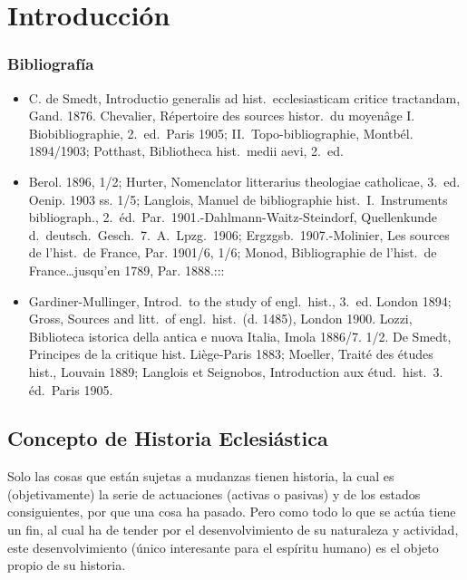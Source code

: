 \raggedbottom{} \documentclass[12pt, a4paper]{book}
\begin{document}
\chapter{Introducción}
\subsection{Bibliografía}
\begin{itemize}
  \item C. de Smedt, Introductio generalis ad hist.\ ecclesiasticam critice tractandam, Gand. 1876. Chevalier, Répertoire des sources histor.\ du moyenâge I. Biobibliographie, 2.\ ed.\ Paris 1905; II.\ Topo-bibliographie, Montbél. 1894/1903; Potthast, Bibliotheca hist.\ medii aevi, 2.\ ed.\
  \item Berol. 1896, 1/2; Hurter, Nomenclator litterarius theologiae catholicae, 3.\ ed. Oenip. 1903 ss. 1/5; Langlois, Manuel de bibliographie hist.\ I.\ Instruments bibliograph., 2.\ éd.\ Par.\ 1901.-Dahlmann-Waitz-Steindorf, Quellenkunde d.\ deutsch.\ Gesch.\ 7.\ A.\ Lpzg.\ 1906; Ergzgsb.\ 1907.-Molinier, Les sources de l'hist.\ de France, Par. 1901/6, 1/6; Monod, Bibliographie de l'hist.\ de France\ldots jusqu'en 1789, Par. 1888.:::
  \item Gardiner-Mullinger, Introd.\ to the study of engl.\ hist., 3.\ ed. London 1894; Gross, Sources and litt.\ of engl.\ hist.\ (d. 1485), London 1900. Lozzi, Biblioteca istorica della antica e nuova Italia, Imola 1886/7. 1/2. De Smedt, Principes de la critique hist. Liège-Paris 1883; Moeller, Traité des études hist., Louvain 1889; Langlois et Seignobos, Introduction aux étud.\ hist.\ 3. éd.\ Paris 1905.
\end{itemize}
\section{Concepto de Historia Eclesiástica}
Solo las cosas que están sujetas a mudanzas tienen historia, la cual es (objetivamente) la serie de actuaciones (activas o pasivas) y de los estados consiguientes, por que una cosa ha pasado. Pero como todo lo que se actúa tiene un fin, al cual ha de tender por el desenvolvimiento de su naturaleza y actividad, este desenvolvimiento (único interesante para el espíritu humano) es el objeto propio de su historia.
\end{document}
